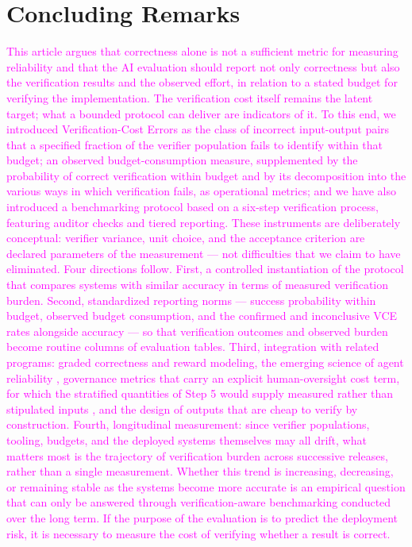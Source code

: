 \documentclass[11pt]{article}
\newcommand{\rev}[1]{\textcolor{magenta}{#1}}
\newcommand{\drift}[1]{\textcolor{cyan!85!black}{#1}}
\newcommand{\bridge}[1]{\textcolor[HTML]{ED7D31}{#1}}
\newcommand{\viola}[1]{\textcolor[HTML]{7030A0}{#1}}
\newcommand{\rev}[1]{#1}
\newcommand{\drift}[1]{#1}
\newcommand{\bridge}[1]{#1}
\newcommand{\viola}[1]{#1}
\begin{document}
\section{Concluding Remarks}
\label{sec:concludingremarks}
\rev{\viola{This article argues that correctness alone is not a sufficient metric for measuring reliability and that the \viola{AI evaluation} should report not only correctness but also the verification results and the observed effort, \viola{in relation to a stated budget for verifying the implementation}. \viola{The verification cost itself remains the latent target}; what a bounded protocol can deliver are indicators of it.} To this end, we introduced Verification-Cost Errors as \viola{the class of incorrect input-output pairs that \viola{a specified fraction} of the verifier population fails to identify within that budget}; \viola{\viola{an observed budget-consumption measure}, supplemented by the probability of correct verification within budget and by its decomposition into the various ways in which verification fails, as operational metrics;} and we have also introduced a benchmarking protocol based on a six-step verification process, featuring auditor checks and tiered reporting. These instruments are deliberately conceptual: verifier variance, unit choice, and the acceptance criterion are declared parameters of the measurement --- not difficulties that we claim to have eliminated. \drift{Four} directions follow. First, a controlled instantiation of the protocol that compares \viola{systems} with similar accuracy in terms of measured verification burden. Second, standardized reporting norms --- \viola{\viola{success probability within budget, observed budget consumption, and the confirmed and inconclusive VCE rates alongside accuracy}} --- \viola{so that verification outcomes and observed burden become routine columns of evaluation tables}. Third, integration with related programs: graded correctness and reward modeling, the emerging science of agent reliability \citep{rabanser2026reliability}, \bridge{governance metrics that carry an explicit human-oversight cost term, for which the stratified quantities of Step 5 would supply measured rather than stipulated inputs \citep{Immediato2026-IJSC},} and the design of outputs that are cheap to verify by construction. \drift{Fourth, longitudinal measurement: since verifier populations, tooling, budgets, and the deployed systems themselves may all drift, what matters most is \viola{the trajectory of verification burden across successive releases}, rather than a single measurement. Whether this trend is increasing, decreasing, or remaining stable as the systems become more accurate is an empirical question that can only be answered through \viola{verification-aware} benchmarking conducted over the long term.} If the purpose of the evaluation is to predict the deployment risk, it is necessary to measure the cost of verifying whether a result is correct.}



\end{document}
